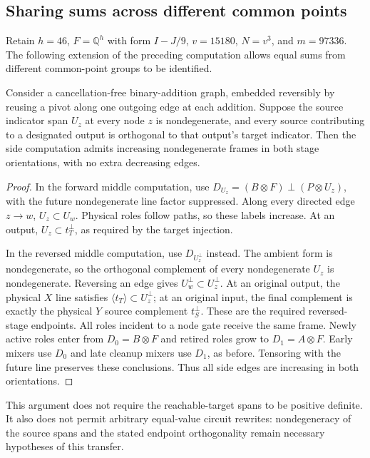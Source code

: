 \subsection{Sharing sums across different common points}
\label{sec:cross-point-sharing}
Retain $h=46$, $F=\mathbb Q^h$ with form $I-J/9$, $v=15180$,
$N=v^3$, and $m=97336$. The following extension of the preceding computation
allows equal sums from different common-point groups to be identified.

\begin{proposition}
Consider a cancellation-free binary-addition graph, embedded reversibly by
reusing a pivot along one outgoing edge at each addition. Suppose the source
indicator span $U_z$ at every node $z$ is nondegenerate, and every source
contributing to a designated output is orthogonal to that output's target
indicator. Then the side computation admits increasing nondegenerate frames
in both stage orientations, with no extra decreasing edges.
\end{proposition}
\begin{proof}
In the forward middle computation, use
$D_{U_z}=(B\otimes F)\mathbin\perp(P\otimes U_z)$, with the future
nondegenerate line factor suppressed. Along every directed edge $z\to w$,
$U_z\subset U_w$. Physical roles follow paths, so these labels increase.
At an output, $U_z\subset t_T^\perp$, as required by the target injection.

In the reversed middle computation, use $D_{U_z^\perp}$ instead. The ambient
form is nondegenerate, so the orthogonal complement of every nondegenerate
$U_z$ is nondegenerate. Reversing an edge gives
$U_w^\perp\subset U_z^\perp$. At an original output, the physical $X$
line satisfies $\langle t_T\rangle\subset U_z^\perp$; at an original
input, the final complement is exactly the physical $Y$ source complement
$t_S^\perp$. These are the required reversed-stage endpoints.
All roles incident to a node gate receive the same frame. Newly active roles
enter from $D_0=B\otimes F$ and retired roles grow to $D_1=A\otimes F$.
Early mixers use $D_0$ and late cleanup mixers use $D_1$, as before.
Tensoring with the future line preserves these conclusions. Thus all side
edges are increasing in both orientations.
\end{proof}

This argument does not require the reachable-target spans to be positive
definite. It also does not permit arbitrary equal-value circuit rewrites:
nondegeneracy of the source spans and the stated endpoint orthogonality remain
necessary hypotheses of this transfer.

